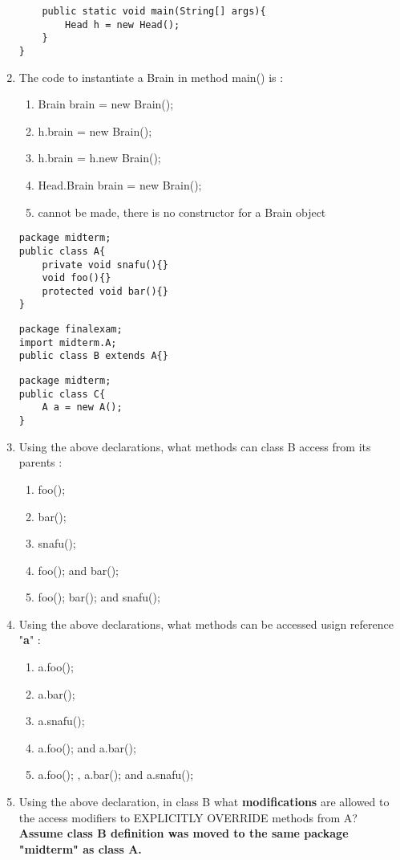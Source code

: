 \documentclass{article}
\begin{document}
\begin{enumerate}
\begin{lstlisting}
	public static void main(String[] args){
		Head h = new Head();
	}
}			
	\end{lstlisting}
	\item The code to instantiate a Brain in method main() is :
	\begin{enumerate}
		\item Brain brain = new Brain();
		\item h.brain = new Brain();
		\item h.brain = h.new Brain();
		\item Head.Brain brain = new Brain();
		\item cannot be made, there is no constructor for a Brain object
	\end{enumerate}
	\newpage
	\begin{lstlisting} 
package midterm;
public class A{
	private void snafu(){}
	void foo(){}
	protected void bar(){}
}
	\end{lstlisting}
	\hrulefill
	\hrulefill
	\begin{lstlisting} 
package finalexam;
import midterm.A;
public class B extends A{}
	\end{lstlisting}
	\hrulefill
	\hrulefill
	\begin{lstlisting} 
package midterm;
public class C{
	A a = new A();
}
	\end{lstlisting}
	\item Using the above declarations, what methods can class B access from its parents :
	\begin{enumerate}
		\item foo();
		\item bar();
		\item snafu();
		\item foo(); and bar();
		\item foo(); bar(); and snafu();
	\end{enumerate}
	\item Using the above declarations, what methods can be accessed usign reference "\textbf{a}" :
	\begin{enumerate}
		\item a.foo();
		\item a.bar();
		\item a.snafu();
		\item a.foo(); and a.bar();
		\item a.foo(); , a.bar(); and a.snafu();
	\end{enumerate}
	\item Using the above declaration, in class B what \textbf{modifications} are allowed to the access modifiers to EXPLICITLY OVERRIDE methods from A? \textbf{Assume class B definition was moved to the same package "midterm" as class A.}

\end{enumerate}
\end{document}
